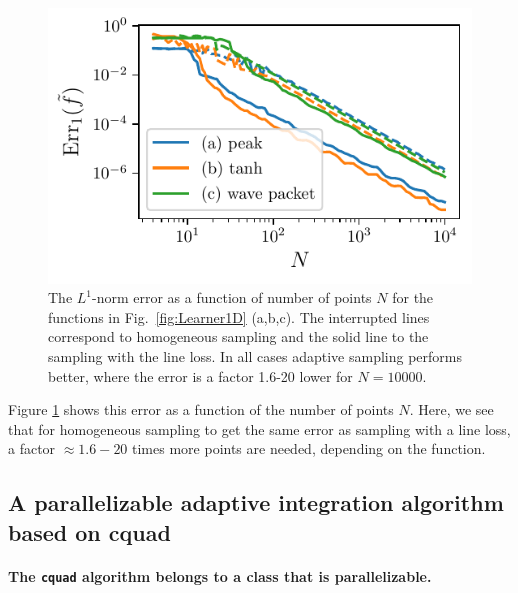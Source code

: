 \documentclass[english, twocolumn, 10pt, aps, superscriptaddress, floatfix, prb, citeautoscript]{revtex4-1}
\begin{document}
\begin{figure}
\centering
\includegraphics{figures/line_loss_error.pdf}
\caption{The \(L^{1}\)-norm error as a function of number of points \(N\) for the functions in Fig.~\ref{fig:Learner1D} (a,b,c).
The interrupted lines correspond to homogeneous sampling and the solid line to the sampling with the line loss.
In all cases adaptive sampling performs better, where the error is a factor 1.6-20 lower for \(N=10000\).\label{fig:line_loss_error}}
\end{figure}

Figure \ref{fig:line_loss_error} shows this error as a function of the number of points \(N\).
Here, we see that for homogeneous sampling to get the same error as sampling with a line loss, a factor \(\approx 1.6-20\) times more points are needed, depending on the function.

\subsection{A parallelizable adaptive integration algorithm based on cquad}

\paragraph{\texorpdfstring{The \texttt{cquad} algorithm belongs to a class that is parallelizable.}{The cquad algorithm belongs to a class that is parallelizable.}}
\end{document}
